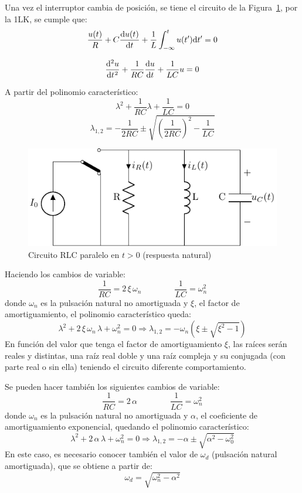 Una vez el interruptor cambia de posición, se tiene el circuito de la
Figura~\ref{fig.transitorio_paralelo_t0+}, por la 1LK, se cumple que:
\[
  \dfrac{u(t)}{R} + C\diff{u(t)}{t} + \frac{1}{L}\int_{-\infty}^t
  u(t') \mathrm{d}t' = 0
\]

\[
  \diff[2]{u}{t} + \frac{1}{RC} \diff{u}{t} + \frac{1}{LC} u = 0
\]

A partir del polinomio característico:
\[
  \lambda^2 + \frac{1}{RC} \lambda + \frac{1}{LC} = 0
\]
\[
  \lambda_{1,2} = -\frac{1}{2RC} \pm
  \sqrt{\left(\frac{1}{2RC}\right)^2 - \frac{1}{LC}}
\]
\begin{figure}[H]
  \centering
  \includegraphics{../figs/transitorio_circuitoRLC_paralelo_t0+.pdf}
  \caption{Circuito RLC paralelo en $t>0$ (respuesta natural)}
  \label{fig.transitorio_paralelo_t0+}
\end{figure}

Haciendo los cambios de variable:
\begin{equation*} {\dfrac{1}{RC}=2\,\xi\,\omega_n}\qquad \qquad
  {\dfrac{1}{LC}=\omega_n^2}
\end{equation*}
donde $\omega_n$ es la pulsación natural no amortiguada y $\xi$, el
factor de amortiguamiento, el polinomio característico queda:
\begin{equation*}
  \lambda^2+2\,\xi\,\omega_n\,\lambda + \omega_n^2=0 \Rightarrow \lambda_{1,2}=-\omega_n\left(\xi\pm\sqrt{\xi^2-1}\right)
\end{equation*}
En función del valor que tenga el factor de amortiguamiento $\xi$, las
raíces serán reales y distintas, una raíz real doble y una raíz
compleja y su conjugada (con parte real o sin ella) teniendo el
circuito diferente comportamiento.
	
\begin{remark}
  Se pueden hacer también los siguientes cambios de variable:
  \begin{equation*} {\dfrac{1}{RC}=2\,\alpha}\qquad \qquad
    {\dfrac{1}{LC}=\omega_n^2}
  \end{equation*}
  donde $\omega_n$ es la pulsación natural no amortiguada y $\alpha$,
  el coeficiente de amortiguamiento exponencial, quedando el polinomio
  característico:
  \begin{equation*}
    \lambda^2+2\,\alpha\,\lambda + \omega_n^2=0 \Rightarrow \lambda_{1,2}=-\alpha \pm \sqrt{\alpha^2 - \omega_0^2}
  \end{equation*}
  En este caso, es necesario conocer también el valor de $\omega_d$
  (pulsación natural amortiguada), que se obtiene a partir de:
  \begin{equation*}
    \omega_d=\sqrt{\omega_n^2-\alpha^2}
  \end{equation*}
\end{remark}
	

